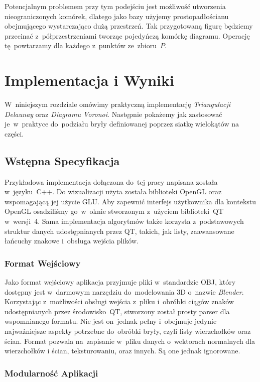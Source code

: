 \documentclass[skorowidz,autorrok,backref,xodstep,oswiadczenie]{wmimgr}
\begin{document}
Potencjalnym problemem przy tym podejściu jest możliwość utworzenia nieograniczonych komórek, dlatego jako bazy użyjemy prostopadłościanu obejmującego wystarczająco dużą przestrzeń. Tak przygotowaną figurę będziemy przecinać z~półprzestrzeniami tworząc pojedyńczą komórkę diagramu. Operację tę~powtarzamy dla każdego z~punktów ze~zbioru~$P$.

\chapter{Implementacja i Wyniki}

W~niniejszym rozdziale omówimy praktyczną implementację \emph{Triangulacji Delaunay} oraz \emph{Diagramu Voronoi}. Następnie pokażemy jak zastosować je~w~praktyce do~podziału bryły definiowanej poprzez siatkę wielokątów na części.

\section{Wstępna Specyfikacja}

Przykładowa implementacja dołączona do~tej pracy napisana została w~języku~C++. Do wizualizacji użyta została biblioteki OpenGL oraz wspomagającą jej użycie GLU. Aby zapewnić interfejs użytkownika dla kontekstu OpenGL osadziliśmy go~w~oknie stworzonym z~użyciem biblioteki~QT w~wersji~4. Sama implementacja algorytmów także korzysta z~podstawowych struktur danych udostępnianych przez QT, takich, jak listy, zaawansowane łańcuchy znakowe i~obsługa wejścia plików.

\subsection{Format Wejściowy}

Jako format wejściowy aplikacja przyjmuje pliki w~standardzie OBJ, który dostępny jest w~darmowym narzędziu do~modelowania 3D o~nazwie \emph{Blender}. Korzystając z~możliwości obsługi wejścia z~pliku i~obróbki ciągów znaków udostępnianych przez środowisko~QT, stworzony został prosty parser dla wspomnianego formatu. Nie jest on~jednak pełny i~obejmuje jedynie najważniejsze aspekty potrzebne do~obróbki bryły, czyli listy wierzchołków oraz ścian. Format pozwala na~zapisanie w~pliku danych o~wektorach normalnych dla wierzchołków i ścian, teksturowaniu, oraz innych. Są one jednak ignorowane.

\subsection{Modularność Aplikacji}
\end{document}
